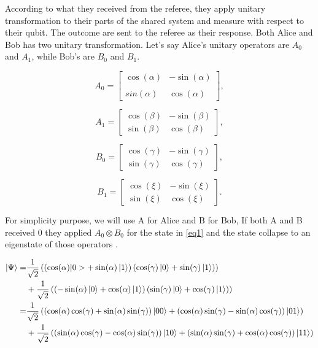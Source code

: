	  
According to what they received from the referee, they apply unitary transformation to their parts of the shared system  and measure with respect to their qubit. The outcome are sent to the referee as their response. Both Alice and Bob has two unitary transformation.  Let's say Alice's unitary operators  are $A_0$ and $A_1$, while Bob's are $B_0$ and $B_1$.
	 
$$	A_0= \begin{bmatrix}
\cos(\alpha) & -\sin(\alpha)\\
\\sin(\alpha) &  \cos(\alpha)
\end{bmatrix},$$	

	
 $$	A_1= \begin{bmatrix}
 \cos(\beta)  &  -\sin(\beta) \\
  \sin(\beta) &  \cos(\beta)
 \end{bmatrix},
 $$
 	

 
 $$
 B_0= \begin{bmatrix}
 \cos(\gamma)  &  -\sin(\gamma) \\
 \sin(\gamma)  &  \cos(\gamma)
 \end{bmatrix},
 $$	

$$
B_1= \begin{bmatrix}
\cos(\xi)  &  -\sin(\xi) \\
\sin(\xi) &  \cos(\xi)
\end{bmatrix}.
$$

For simplicity purpose, we will use A for Alice and B for Bob, If both A and B  received $0$ they applied $A_0\otimes B_0$ for the state in \ref{eq1} and the state collapse to an eigenstate of those operators .



\begin{align*}
\ket{\Psi }=& \frac{1}{\sqrt{2}}\left( \left(\cos(\alpha)|0>+\sin(\alpha)\ket{1} \right) \left(\cos(\gamma)\ket{0}+\sin(\gamma)\ket{1} \right) \right)  \\  
&+ \frac{1}{\sqrt{2}} \left( \left(-\sin(\alpha)\ket{0}+\cos(\alpha)\ket{1} \right) \left(\sin(\gamma)\ket{0}+\cos(\gamma)\ket{1} \right) \right)\\
 =& \frac{1}{\sqrt{2}}\left(\left(\cos(\alpha) \cos(\gamma)+\sin(\alpha) \sin(\gamma)\right)\ket{00}+\left( \cos(\alpha)  \sin(\gamma)-\sin(\alpha)  \cos(\gamma)\right)\ket{01}\right)\\
&+\frac{1}{\sqrt{2}}\left( \left( \sin(\alpha)  \cos(\gamma)-\cos(\alpha) \sin(\gamma)\right)\ket{10}+\left(\sin(\alpha)  \sin(\gamma)+\cos(\alpha)  \cos(\gamma)\right)\ket{11}\right)
\end{align*}

